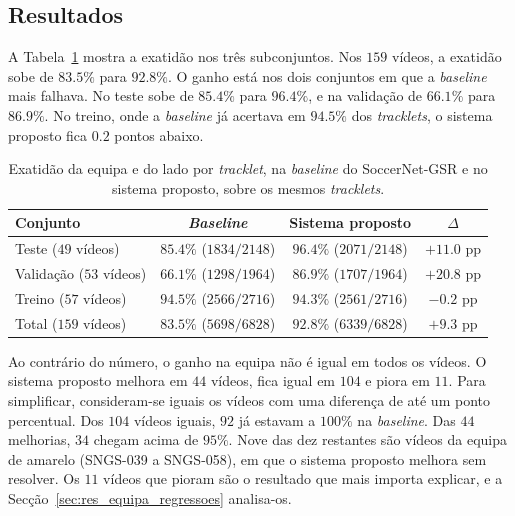 \subsection{Resultados}\label{sec:res_equipa_resultados}

A Tabela~\ref{tab:team-conjuntos} mostra a exatidão nos três subconjuntos. Nos $159$ vídeos, a exatidão sobe de $83.5\%$ para $92.8\%$. O ganho está nos dois conjuntos em que a \emph{baseline} mais falhava. No teste sobe de $85.4\%$ para $96.4\%$, e na validação de $66.1\%$ para $86.9\%$. No treino, onde a \emph{baseline} já acertava em $94.5\%$ dos \emph{tracklets}, o sistema proposto fica $0.2$ pontos abaixo.

\begin{table}[H]
    \centering
    \caption{Exatidão da equipa e do lado por \emph{tracklet}, na \emph{baseline} do SoccerNet-GSR e no sistema proposto, sobre os mesmos \emph{tracklets}.}
    \label{tab:team-conjuntos}
    \begin{tabular}{|l|c|c|c|}
        \hline
        \textbf{Conjunto} & \textbf{\emph{Baseline}} & \textbf{Sistema proposto} & \textbf{$\Delta$} \\
        \hline
        Teste ($49$ vídeos)     & $85.4\%$ ($1834/2148$) & $96.4\%$ ($2071/2148$) & $+11.0$ pp \\
        \hline
        Validação ($53$ vídeos) & $66.1\%$ ($1298/1964$) & $86.9\%$ ($1707/1964$) & $+20.8$ pp \\
        \hline
        Treino ($57$ vídeos)    & $94.5\%$ ($2566/2716$) & $94.3\%$ ($2561/2716$) & $-0.2$ pp \\
        \hline
        Total ($159$ vídeos)    & $83.5\%$ ($5698/6828$) & $92.8\%$ ($6339/6828$) & $+9.3$ pp \\
        \hline
    \end{tabular}
\end{table}

Ao contrário do número, o ganho na equipa não é igual em todos os vídeos. O sistema proposto melhora em $44$ vídeos, fica igual em $104$ e piora em $11$. Para simplificar, consideram-se iguais os vídeos com uma diferença de até um ponto percentual. Dos $104$ vídeos iguais, $92$ já estavam a $100\%$ na \emph{baseline}. Das $44$ melhorias, $34$ chegam acima de $95\%$. Nove das dez restantes são vídeos da equipa de amarelo (SNGS-039 a SNGS-058), em que o sistema proposto melhora sem resolver. Os $11$ vídeos que pioram são o resultado que mais importa explicar, e a Secção~\ref{sec:res_equipa_regressoes} analisa-os.

